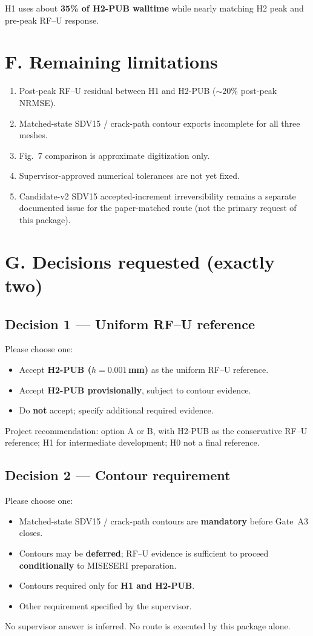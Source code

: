 \documentclass[11pt,a4paper]{article}
\begin{document}
H1 uses about \textbf{35\% of H2-PUB walltime} while nearly matching H2 peak and pre-peak RF--U response.

\section*{F. Remaining limitations}
\begin{enumerate}
  \item Post-peak RF--U residual between H1 and H2-PUB ($\sim 20\%$ post-peak NRMSE).
  \item Matched-state SDV15 / crack-path contour exports incomplete for all three meshes.
  \item Fig.~7 comparison is approximate digitization only.
  \item Supervisor-approved numerical tolerances are not yet fixed.
  \item Candidate-v2 SDV15 accepted-increment irreversibility remains a separate documented issue for the paper-matched route (not the primary request of this package).
\end{enumerate}

\section*{G. Decisions requested (exactly two)}

\subsection*{Decision 1 --- Uniform RF--U reference}
Please choose one:
\begin{itemize}
  \item[\textbf{A}] Accept \textbf{H2-PUB ($h=0.001$\,mm)} as the uniform RF--U reference.
  \item[\textbf{B}] Accept \textbf{H2-PUB provisionally}, subject to contour evidence.
  \item[\textbf{C}] Do \textbf{not} accept; specify additional required evidence.
\end{itemize}
Project recommendation: option A or B, with H2-PUB as the conservative RF--U reference; H1 for intermediate development; H0 not a final reference.

\subsection*{Decision 2 --- Contour requirement}
Please choose one:
\begin{itemize}
  \item[\textbf{A}] Matched-state SDV15 / crack-path contours are \textbf{mandatory} before Gate~A3 closes.
  \item[\textbf{B}] Contours may be \textbf{deferred}; RF--U evidence is sufficient to proceed \textbf{conditionally} to MISESERI preparation.
  \item[\textbf{C}] Contours required only for \textbf{H1 and H2-PUB}.
  \item[\textbf{D}] Other requirement specified by the supervisor.
\end{itemize}
No supervisor answer is inferred. No route is executed by this package alone.
\end{document}
